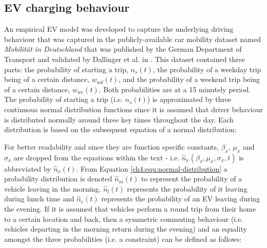\subsection{EV charging behaviour}
\label{ch4:subsec:ev-charging-behaviour}


An empirical EV model was developed to capture the underlying driving behaviour that was captured in the publicly-available car mobility dataset named \textit{Mobilit\"{a}t in Deutschland} that was published by the German Department of Transport \cite{MiD2008} and validated by Dallinger et al. in \cite{Dallinger2012}.
This dataset contained three parts: the probability of starting a trip, $n_{s}(t)$, the probability of a weekday trip being of a certain distance, $w_{wd}(t)$, and the probability of a weekend trip being of a certain distance, $w_{we}(t)$.
Both probabilities are at a 15 minutely period.
The probability of starting a trip (i.e. $n_{s}(t)$) is approximated by three continuous normal distribution functions since it is assumed that driver behaviour is distributed normally around three key times throughout the day.
Each distribution is based on the subsequent equation of a normal distribution:



For better readability and since they are function specific constants, $\beta_x$, $\mu_x$ and $\sigma_x$ are dropped from the equations within the text - i.e. $\hat{n}_x(\beta_x,\mu_x,\sigma_x,t)$ is abbreviated by $\hat{n}_x(t)$.
From Equation \ref{ch4:equ:normal-distribution} a probability distribution is denoted $\hat{n}_{m}(t)$ to represent the probability of a vehicle leaving in the morning.
$\hat{n}_{l}(t)$ represents the probability of it leaving during lunch time and $\hat{n}_{e}(t)$ represents the probability of an EV leaving during the evening.
If it is assumed that vehicles perform a round trip from their home to a certain location and back, then a symmetric commuting behaviour (i.e. vehicles departing in the morning return during the evening) and an equality amongst the three probabilities (i.e. a constraint) can be defined as follows:



